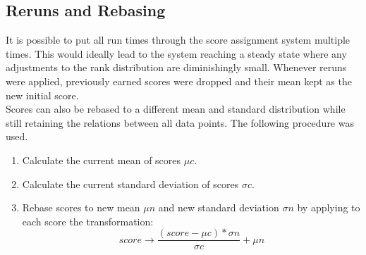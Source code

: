 \subsection{Reruns and Rebasing}
It is possible to put all run times through the score assignment system multiple times. This would ideally lead to the system reaching a steady state where any adjustments to the rank distribution are diminishingly small. Whenever reruns were applied, previously earned scores were dropped and their mean kept as the new initial score.\\ 
Scores can also be rebased to a different mean and standard distribution while still retaining the relations between all data points. The following procedure was used.
\begin{enumerate}
\item Calculate the current mean of scores $\mu c$.
\item Calculate the current standard deviation of scores $\sigma c$.
\item Rebase scores to new mean $\mu n$ and new standard deviation $\sigma n$ by applying to each score the transformation:
\begin{equation}
	score \rightarrow \frac{(score - \mu c) * \sigma n}{\sigma c} + \mu n
\end{equation}
\end{enumerate}